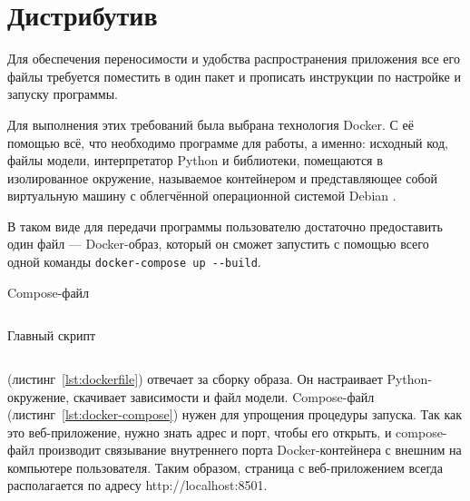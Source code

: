 \section{Дистрибутив}

Для обеспечения переносимости и удобства распространения приложения все его файлы требуется поместить в один пакет и прописать инструкции по настройке и запуску программы.

Для выполнения этих требований была выбрана технология Docker. С её помощью всё, что необходимо программе для работы, а именно: исходный код, файлы модели, интерпретатор Python и библиотеки, помещаются в изолированное окружение, называемое контейнером и представляющее собой виртуальную машину с облегчённой операционной системой Debian \cite{doc:docker}.

В таком виде для передачи программы пользователю достаточно предоставить один файл --- Docker-образ, который он сможет запустить с помощью всего одной команды \verb|docker-compose up --build|.

\begin{listing}[h]
    \caption{Compose-файл}
    \inputminted{text}{../inc/code/docker-compose.yml}
    \label{lst:docker-compose}
\end{listing}

\begin{listing}[h]
    \caption{Главный скрипт }
    \inputminted{text}{../inc/code/Dockerfile.txt}
    \label{lst:dockerfile}
\end{listing}

% 
% 

 (листинг \ref*{lst:dockerfile}) отвечает за сборку образа. Он настраивает Python-окружение, скачивает зависимости и файл модели. Compose-файл (листинг \ref*{lst:docker-compose}) нужен для упрощения процедуры запуска. Так как это веб-приложение, нужно знать адрес и порт, чтобы его открыть, и compose-файл производит связывание внутреннего порта Docker-контейнера с внешним на компьютере пользователя. Таким образом, страница с веб-приложением всегда располагается по адресу http://localhost:8501.